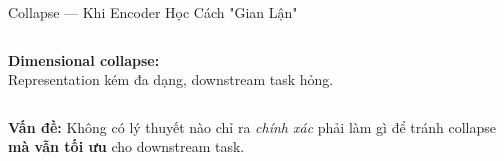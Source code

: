 \documentclass[aspectratio=169,9pt]{beamer}
\begin{document}
\begin{frame}{Collapse — Khi Encoder Học Cách "Gian Lận"}
\begin{columns}[T]
\begin{accentbox}
\footnotesize \textbf{Dimensional collapse:}\\ Representation kém đa dạng, downstream task hỏng.
\end{accentbox}
\end{columns}

\vspace{0.5cm}
\begin{center}
\footnotesize \textbf{Vấn đề:} Không có lý thuyết nào chỉ ra \emph{chính xác} phải làm gì để tránh collapse \textbf{mà vẫn tối ưu} cho downstream task.
\end{center}

\end{frame}


\end{document}
